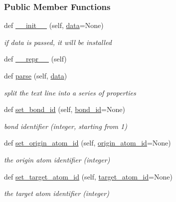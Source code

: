 \subsubsection*{Public Member Functions}
\begin{DoxyCompactItemize}
\item 
def \hyperlink{classsrc_1_1Mol2_1_1mol2__bond_a14c3e0c4ad994f336ef56700aabda4a8}{\+\_\+\+\_\+init\+\_\+\+\_\+} (self, \hyperlink{namespacesrc_1_1Mol2_a12bf18db47042b1704de5e1fb05b2ade}{data}=None)
\begin{DoxyCompactList}\small\item\em if data is passed, it will be installed \end{DoxyCompactList}\item 
def \hyperlink{classsrc_1_1Mol2_1_1mol2__bond_a00120739b7a37cb20068552ad53f6159}{\+\_\+\+\_\+repr\+\_\+\+\_\+} (self)
\item 
def \hyperlink{classsrc_1_1Mol2_1_1mol2__bond_aed0e7a537ae4bf0b4be69a1b03c297e0}{parse} (self, \hyperlink{namespacesrc_1_1Mol2_a12bf18db47042b1704de5e1fb05b2ade}{data})
\begin{DoxyCompactList}\small\item\em split the text line into a series of properties \end{DoxyCompactList}\item 
def \hyperlink{classsrc_1_1Mol2_1_1mol2__bond_af07dc3dfa15804f72e45933c3f0d6a83}{set\+\_\+bond\+\_\+id} (self, \hyperlink{classsrc_1_1Mol2_1_1mol2__bond_afe6abbb34e33f4ba7fe25d8e1d62683a}{bond\+\_\+id}=None)
\begin{DoxyCompactList}\small\item\em bond identifier (integer, starting from 1) \end{DoxyCompactList}\item 
def \hyperlink{classsrc_1_1Mol2_1_1mol2__bond_af68218cad88736c51ce5efde940e9ad8}{set\+\_\+origin\+\_\+atom\+\_\+id} (self, \hyperlink{classsrc_1_1Mol2_1_1mol2__bond_a5398fa9b38fd91b27365db7371ec6690}{origin\+\_\+atom\+\_\+id}=None)
\begin{DoxyCompactList}\small\item\em the origin atom identifier (integer) \end{DoxyCompactList}\item 
def \hyperlink{classsrc_1_1Mol2_1_1mol2__bond_a0534fd1edfa863de26314114bc007ff5}{set\+\_\+target\+\_\+atom\+\_\+id} (self, \hyperlink{classsrc_1_1Mol2_1_1mol2__bond_ae2417295a726650e16cc71984487d37d}{target\+\_\+atom\+\_\+id}=None)
\begin{DoxyCompactList}\small\item\em the target atom identifier (integer) \end{DoxyCompactList}\item 

\end{DoxyCompactItemize}
